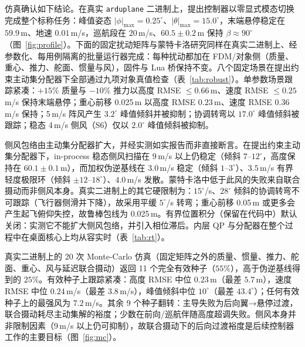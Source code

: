 \documentclass[UTF8,a4paper,11pt]{ctexart}
\begin{document}
仿真确认如下结论。在真实 \texttt{arduplane} 二进制上，提出控制器以零显式模态切换完成整个标称任务：峰值姿态 $|\phi|_{\max}=0.25^\circ$、$|\theta|_{\max}=15.0^\circ$，末端悬停稳定在 $59.9$\,m、地速 $0.01$\,m/s，巡航段在 $20$\,m/s、$60.5\pm0.2$\,m 保持 $\beta\approx90^\circ$（图~\ref{fig:profile}）。下面的固定扰动矩阵与蒙特卡洛研究同样在真实二进制上、经参数化、每用例隔离的批量运行器完成：每种扰动都加在 FDM/对象侧（质量、重心、推力、舵面、惯量与风），固件与 Lua 桥保持不变。八个固定场景在提出约束主动集分配器下全部通过九项对象真值检查（表~\ref{tab:robust}）。单参数场景跟踪紧凑：$+15\%$ 质量与 $-10\%$ 推力以高度 RMSE $\le 0.66$\,m、速度 RMSE $\le 0.25$\,m/s 保持末端悬停；重心前移 0.025\,m 以高度 RMSE $0.23$\,m、速度 RMSE $0.36$\,m/s 保持；5\,m/s 阵风产生 $3.2^\circ$ 峰值倾斜并被抑制；协调转弯以 $17.0^\circ$ 峰值倾斜被跟踪；稳态 4\,m/s 侧风（S6）仅以 $2.0^\circ$ 峰值倾斜被抑制。

侧风包络由主动集分配器扩大，并经实测如实报告而非直接断言。在提出约束主动集分配器下，in-process 稳态侧风扫描在 $9$\,m/s 以上仍稳定（倾斜 $7$--$12^\circ$，高度保持在 $60.1\pm0.1$\,m），而加权伪逆基线在 $3.0$\,m/s 稳定（倾斜 $1$--$3^\circ$）、$3.5$\,m/s 有界轻度极限环（倾斜 $\pm12$--$18^\circ$）、$4.0$\,m/s 发散。蒙特卡洛中低于此风的失败来自联合摄动而非侧风本身。真实二进制上的其它硬限制为：$15^\circ$/s、$28^\circ$ 倾斜的协调转弯不可跟踪（飞行器侧滑并下降），故采用平缓 $5^\circ$/s 转弯；重心前移 0.05\,m 或更多会产生起飞俯仰失控，故鲁棒包线为 0.025\,m。有界位置积分（保留在代码中）默认关闭：实测它不能扩大侧风包络，并引入相位滞后。内层 QP 与分配器在整个过程中在桌面核心上均从容实时（表~\ref{tab:rt}）。

真实二进制上的 20 次 Monte-Carlo 仿真（固定矩阵之外的质量、惯量、推力、舵面、重心、风与延迟联合摄动）返回 11 个完全有效种子（$55\%$），高于伪逆基线得到的 $25\%$。有效种子上跟踪紧凑：高度 RMSE 中位 $0.23$\,m（最差 $5.7$\,m），速度 RMSE 中位 $0.24$\,m/s（最差 $3.8$\,m/s），峰值倾斜中位 $10^\circ$（最差 $43.4^\circ$）；任何有效种子上的最强风为 $7.2$\,m/s。其余 9 个种子翻转：主导失败为后向翼→悬停过渡，联合摄动耗尽主动集解的裕度；少数在前向/巡航伴随高度超调失败。侧风本身并非限制因素（9\,m/s 以上仍可抑制），故联合摄动下的后向过渡裕度是后续控制器工作的主要目标（图~\ref{fig:mc}）。
\end{document}
